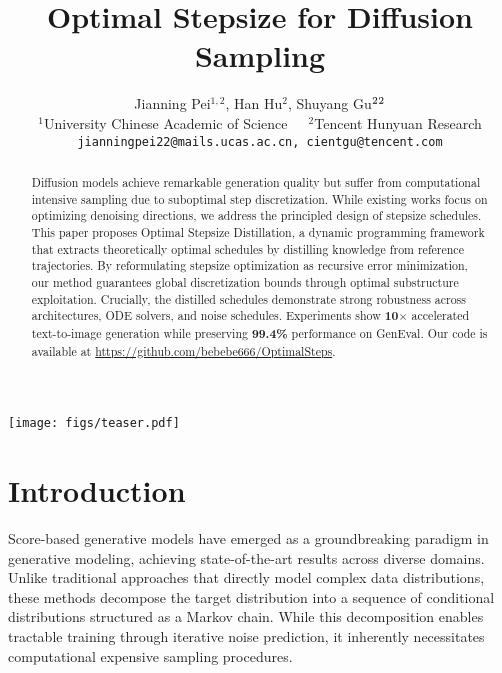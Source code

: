 \documentclass[10pt,twocolumn,letterpaper]{article}
\title{Optimal Stepsize for Diffusion Sampling}
\author{Jianning Pei$^{1,2}$, Han Hu$^{2}$, Shuyang Gu$^{2}\footnotemark[2]$\\
$^{1}$University Chinese Academic of Science\ \ \ $^{2}$Tencent Hunyuan Research\\
{\tt\small jianningpei22@mails.ucas.ac.cn, cientgu@tencent.com}
}
\begin{document}
\maketitle

\renewcommand{\thefootnote}{\fnsymbol{footnote}}  


\begin{strip}\centering
\vspace{-0.6cm}
\texttt{[image: figs/teaser.pdf]}
\vspace{-0.6cm}
\end{strip}


\begin{abstract}
        Diffusion models achieve remarkable generation quality but suffer from computational intensive sampling due to suboptimal step discretization. While existing works focus on optimizing denoising directions, we address the principled design of stepsize schedules. This paper proposes Optimal Stepsize Distillation, a dynamic programming framework that extracts theoretically optimal schedules by distilling knowledge from reference trajectories. By reformulating stepsize optimization as recursive error minimization, our method guarantees global discretization bounds through optimal substructure exploitation. Crucially, the distilled schedules demonstrate strong robustness across architectures, ODE solvers, and noise schedules. Experiments show \textbf{10$\times$} accelerated text-to-image generation while preserving \textbf{99.4\%} performance on GenEval. Our code is available at \url{https://github.com/bebebe666/OptimalSteps}.
\end{abstract}
 \section{Introduction}
    Score-based generative models \cite{scorematching,song2020improved} have emerged as a groundbreaking paradigm in generative modeling, achieving state-of-the-art results across diverse domains. Unlike traditional approaches that directly model complex data distributions, these methods decompose the target distribution into a sequence of conditional distributions structured as a Markov chain.  While this decomposition enables tractable training through iterative noise prediction, it inherently necessitates computational expensive sampling procedures.
\end{document}
